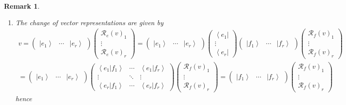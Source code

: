 \documentclass[aps,preprint]{revtex4}
\newtheorem{remark}[theorem]{Remark}
\begin{document}
\begin{remark}
\begin{enumerate}
\item The change of vector representations are given by%
\begin{gather}
v=\left( 
\begin{array}{ccc}
\left\vert e_{1}\right\rangle & \cdots & \left\vert e_{r}\right\rangle%
\end{array}%
\right) \left( 
\begin{array}{c}
\mathcal{R}_{e}\left( v\right) _{1} \\ 
\vdots \\ 
\mathcal{R}_{e}\left( v\right) _{r}%
\end{array}%
\right) =\left( 
\begin{array}{ccc}
\left\vert e_{1}\right\rangle & \cdots & \left\vert e_{r}\right\rangle%
\end{array}%
\right) \left( 
\begin{array}{c}
\left\langle e_{1}\right\vert \\ 
\vdots \\ 
\left\langle e_{r}\right\vert%
\end{array}%
\right) \left( 
\begin{array}{ccc}
\left\vert f_{1}\right\rangle & \cdots & \left\vert f_{r}\right\rangle%
\end{array}%
\right) \left( 
\begin{array}{c}
\mathcal{R}_{f}\left( v\right) _{1} \\ 
\vdots \\ 
\mathcal{R}_{f}\left( v\right) _{r}%
\end{array}%
\right) \\
=\left( 
\begin{array}{ccc}
\left\vert e_{1}\right\rangle & \cdots & \left\vert e_{r}\right\rangle%
\end{array}%
\right) \left( 
\begin{array}{ccc}
\left\langle \left. e_{1}\right\vert f_{1}\right\rangle & \cdots & 
\left\langle \left. e_{1}\right\vert f_{r}\right\rangle \\ 
\vdots & \ddots & \vdots \\ 
\left\langle \left. e_{r}\right\vert f_{1}\right\rangle & \cdots & 
\left\langle \left. e_{r}\right\vert f_{r}\right\rangle%
\end{array}%
\right) \left( 
\begin{array}{c}
\mathcal{R}_{f}\left( v\right) _{1} \\ 
\vdots \\ 
\mathcal{R}_{f}\left( v\right) _{r}%
\end{array}%
\right) =\left( 
\begin{array}{ccc}
\left\vert f_{1}\right\rangle & \cdots & \left\vert f_{r}\right\rangle%
\end{array}%
\right) \left( 
\begin{array}{c}
\mathcal{R}_{f}\left( v\right) _{1} \\ 
\vdots \\ 
\mathcal{R}_{f}\left( v\right) _{r}%
\end{array}%
\right)
\end{gather}%
hence


\end{enumerate}
\end{remark}
\end{document}
